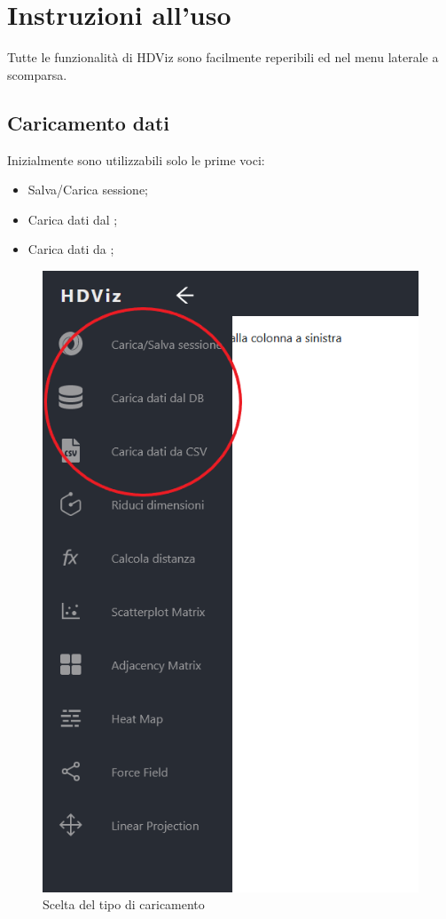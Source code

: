 \section{Instruzioni all'uso}
Tutte le funzionalità di HDViz sono facilmente reperibili ed nel menu laterale a scomparsa.

\subsection{Caricamento dati}
Inizialmente sono utilizzabili solo le prime voci:
\begin{itemize}
	\item Salva/Carica sessione;
	\item Carica dati dal ;
	\item Carica dati da ;
\end{itemize}
\begin{figure}[H]
		\includegraphics[scale=0.4]{Images/SceltaCaricamento.png}
		\centering
		\caption{Scelta del tipo di caricamento}
\end{figure}

